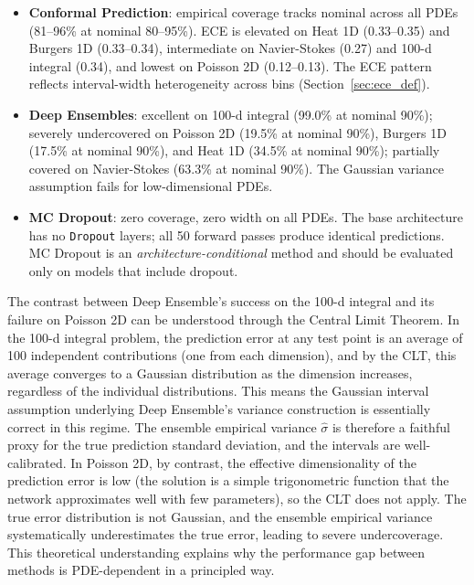 \documentclass[12pt,a4paper]{article}
\theoremstyle{plain}
\begin{document}
\begin{itemize}
    \item \textbf{Conformal Prediction}: empirical coverage tracks nominal
        across all PDEs (81--96\% at nominal 80--95\%).
        ECE is elevated on Heat 1D (0.33--0.35) and Burgers 1D (0.33--0.34),
        intermediate on Navier-Stokes (0.27) and 100-d integral (0.34),
        and lowest on Poisson 2D (0.12--0.13).  The ECE pattern reflects
        interval-width heterogeneity across bins (Section~\ref{sec:ece_def}).
    \item \textbf{Deep Ensembles}: excellent on 100-d integral
        (99.0\% at nominal 90\%); severely undercovered on Poisson 2D
        (19.5\% at nominal 90\%), Burgers 1D (17.5\% at nominal 90\%),
        and Heat 1D (34.5\% at nominal 90\%); partially covered on
        Navier-Stokes (63.3\% at nominal 90\%).
        The Gaussian variance assumption fails for low-dimensional PDEs.
    \item \textbf{MC Dropout}: zero coverage, zero width on all PDEs.
        The base architecture has no \texttt{Dropout} layers;
        all 50 forward passes produce identical predictions.
        MC Dropout is an \emph{architecture-conditional} method
        and should be evaluated only on models that include dropout.
\end{itemize}

The contrast between Deep Ensemble's success on the 100-d integral and its
failure on Poisson 2D can be understood through the Central Limit Theorem. In
the 100-d integral problem, the prediction error at any test point is an
average of 100 independent contributions (one from each dimension), and by
the CLT, this average converges to a Gaussian distribution as the dimension
increases, regardless of the individual distributions. This means the Gaussian
interval assumption underlying Deep Ensemble's variance construction is
essentially correct in this regime. The ensemble empirical variance $\hat\sigma$
is therefore a faithful proxy for the true prediction standard deviation,
and the intervals are well-calibrated. In Poisson 2D, by contrast, the effective
dimensionality of the prediction error is low (the solution is a simple
trigonometric function that the network approximates well with few parameters),
so the CLT does not apply. The true error distribution is not Gaussian, and
the ensemble empirical variance systematically underestimates the true error,
leading to severe undercoverage. This theoretical understanding explains why
the performance gap between methods is PDE-dependent in a principled way.
\end{document}
